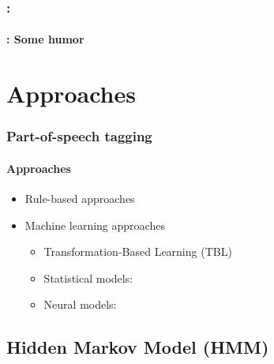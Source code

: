 \documentclass[xcolor=table]{beamer}
\begin{document}
\begin{frame}
	\frametitle{\insertshortsubtitle: \insertsection}
	\framesubtitle{\insertsubsection: Some humor}

	\begin{center}
	\end{center}

\end{frame}

\section{Approaches}

\begin{frame}
\frametitle{Part-of-speech tagging}
\framesubtitle{Approaches}

	\begin{itemize}
		\item Rule-based approaches
		
		\item Machine learning approaches
		\begin{itemize}
			\item Transformation-Based Learning (TBL)
			\item Statistical models: 
			\item Neural models: 
		\end{itemize}
	\end{itemize}

\end{frame}

\subsection{Hidden Markov Model (HMM)}
\end{document}
